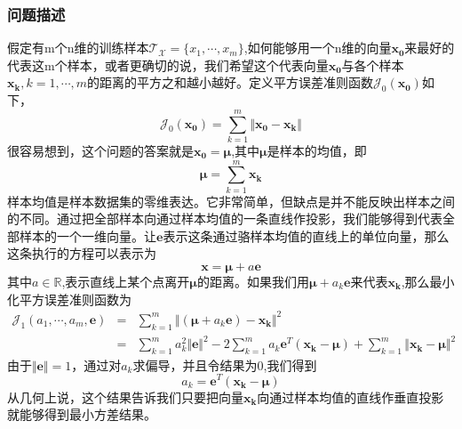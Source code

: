 \documentclass[10pt,a4paper]{article}
\begin{document}
\begin{CJK*}{UTF8}{song}
\subsubsection{问题描述}
假定有m个n维的训练样本$\mathcal{T_X}=\{x_1,\cdots,x_m\}$,如何能够用一个n维的向量$\boldsymbol{x_0}$来最好的代表这m个样本，或者更确切的说，我们希望这个代表向量$\boldsymbol{x_0}$与各个样本$\boldsymbol{x_k},k=1,\cdots,m$的距离的平方之和越小越好。定义平方误差准则函数$\mathcal{J}_0(\boldsymbol{x_0})$如下，
\begin{equation}
\mathcal{J}_0(\boldsymbol{x_0})=\sum_{k=1}^{m}\Vert\boldsymbol{x_0}-\boldsymbol{x_k}\Vert
\end{equation}
很容易想到，这个问题的答案就是$\boldsymbol{x_0}=\boldsymbol{\mu}$,其中$\boldsymbol{\mu}$是样本的均值，即
\begin{equation}
\boldsymbol{\mu}=\sum_{k=1}^{m}\boldsymbol{x_k}
\end{equation}
样本均值是样本数据集的零维表达。它非常简单，但缺点是并不能反映出样本之间的不同。通过把全部样本向通过样本均值的一条直线作投影，我们能够得到代表全部样本的一个一维向量。让$\boldsymbol{e}$表示这条通过骆样本均值的直线上的单位向量，那么这条执行的方程可以表示为
\begin{equation}
\label{direction}
\boldsymbol{x}=\boldsymbol{\mu}+a\boldsymbol{e}
\end{equation}
其中$a\in\mathbb{R}$,表示直线上某个点离开$\boldsymbol{\mu}$的距离。如果我们用$\boldsymbol{\mu}+a_k\boldsymbol{e}$来代表$\boldsymbol{x_k}$,那么最小化平方误差准则函数为
\begin{eqnarray}
\label{minsquerr}
\mathcal{J}_1(a_1,\cdots,a_m,\boldsymbol{e})\nonumber
&=&\sum_{k=1}^{m}\Vert(\boldsymbol{\mu}+a_k\boldsymbol{e})-\boldsymbol{x_k}\Vert^2\\
&=&\sum_{k=1}^{m}a_k^2\Vert\boldsymbol{e}\Vert^2-
2\sum_{k=1}^{m}a_k\boldsymbol{e}^T(\boldsymbol{x_k}-\boldsymbol{\mu})+
\sum_{k=1}^{m}\Vert\boldsymbol{x_k}-\boldsymbol{\mu}\Vert^2 
\end{eqnarray}
由于$\Vert\boldsymbol{e}\Vert=1$，通过对$a_k$求偏导，并且令结果为0,我们得到
\begin{equation}
\label{opitialdirection}
a_k=\boldsymbol{e}^T(\boldsymbol{x_k}-\boldsymbol{\mu})
\end{equation}
从几何上说，这个结果告诉我们只要把向量$\boldsymbol{x_k}$向通过样本均值的直线作垂直投影就能够得到最小方差结果。


\end{CJK*}
\end{document}
